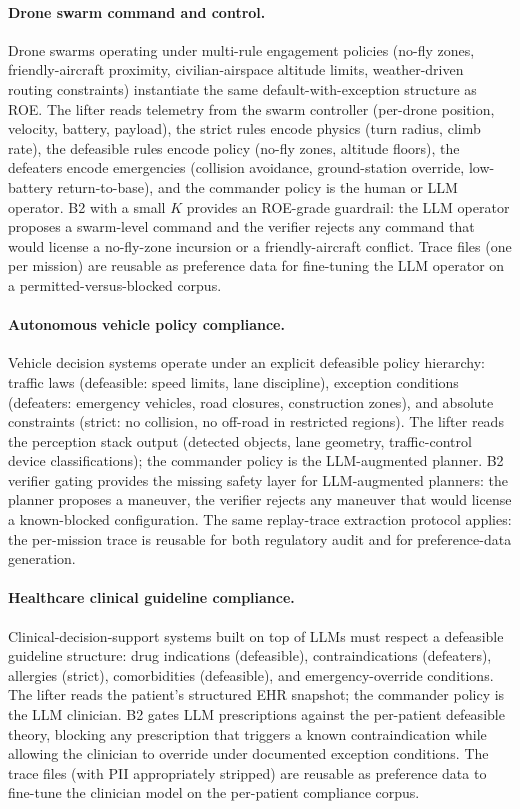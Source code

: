 \documentclass{article}
\theoremstyle{definition}
\begin{document}
\paragraph{Drone swarm command and control.} Drone swarms operating under multi-rule engagement policies (no-fly zones, friendly-aircraft proximity, civilian-airspace altitude limits, weather-driven routing constraints) instantiate the same default-with-exception structure as ROE. The lifter reads telemetry from the swarm controller (per-drone position, velocity, battery, payload), the strict rules encode physics (turn radius, climb rate), the defeasible rules encode policy (no-fly zones, altitude floors), the defeaters encode emergencies (collision avoidance, ground-station override, low-battery return-to-base), and the commander policy is the human or LLM operator. B2 with a small $K$ provides an ROE-grade guardrail: the LLM operator proposes a swarm-level command and the verifier rejects any command that would license a no-fly-zone incursion or a friendly-aircraft conflict. Trace files (one per mission) are reusable as preference data for fine-tuning the LLM operator on a permitted-versus-blocked corpus.

\paragraph{Autonomous vehicle policy compliance.} Vehicle decision systems operate under an explicit defeasible policy hierarchy: traffic laws (defeasible: speed limits, lane discipline), exception conditions (defeaters: emergency vehicles, road closures, construction zones), and absolute constraints (strict: no collision, no off-road in restricted regions). The lifter reads the perception stack output (detected objects, lane geometry, traffic-control device classifications); the commander policy is the LLM-augmented planner. B2 verifier gating provides the missing safety layer for LLM-augmented planners: the planner proposes a maneuver, the verifier rejects any maneuver that would license a known-blocked configuration. The same replay-trace extraction protocol applies: the per-mission trace is reusable for both regulatory audit and for preference-data generation.

\paragraph{Healthcare clinical guideline compliance.} Clinical-decision-support systems built on top of LLMs must respect a defeasible guideline structure: drug indications (defeasible), contraindications (defeaters), allergies (strict), comorbidities (defeasible), and emergency-override conditions. The lifter reads the patient's structured EHR snapshot; the commander policy is the LLM clinician. B2 gates LLM prescriptions against the per-patient defeasible theory, blocking any prescription that triggers a known contraindication while allowing the clinician to override under documented exception conditions. The trace files (with PII appropriately stripped) are reusable as preference data to fine-tune the clinician model on the per-patient compliance corpus.
\end{document}
